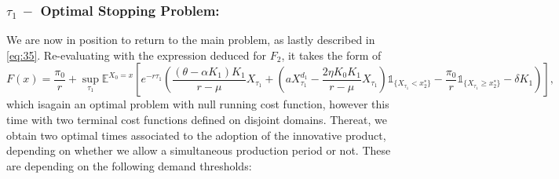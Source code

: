 \subsubsection{$\tau_1 \ - $ Optimal Stopping Problem:}

We are now in position to return to the main problem, as lastly described in \eqref{eq:35}. Re-evaluating with the expression deduced for $F_2$, it takes the form of
\begin{equation}
F(x)=\frac{\pi_0}{r}+\sup _{\tau_1} \mathds{E}^{X_0=x} \left[ e^{-r \tau_1} \left( \frac{(\theta-\alpha K_1)K_1}{r-\mu} X_{\tau_1}+ 
\left( a X_{\tau_1}^{d_1} -\frac{2 \eta K_0 K_1}{r-\mu} X_{\tau_1} \right) \mathds{1}_{ \{X_{\tau_1}<x_2^* \} } -\frac{\pi_0}{r}\mathds{1}_{ \{ X_{\tau_1} \geq x_2^* \} }
-\delta K_1 \right) \right],
\label{eq:f2x}
\end{equation}
which isagain an optimal problem with null running cost function, however this time with two terminal cost functions defined on disjoint domains. Thereat, we obtain two optimal times associated to the adoption of the innovative product, depending on whether we allow a simultaneous production period or not. These are depending on the following demand thresholds: 

